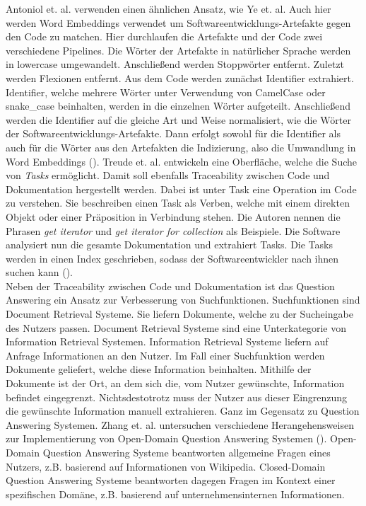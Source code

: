 Antoniol et. al. verwenden einen ähnlichen Ansatz, wie Ye et. al.
Auch hier werden Word Embeddings verwendet um Softwareentwicklungs-Artefakte gegen den Code zu matchen.
Hier durchlaufen die Artefakte und der Code zwei verschiedene Pipelines.
Die Wörter der Artefakte in natürlicher Sprache werden in lowercase umgewandelt.
Anschließend werden Stoppwörter entfernt.
Zuletzt werden Flexionen entfernt.
Aus dem Code werden zunächst Identifier extrahiert.
Identifier, welche mehrere Wörter unter Verwendung von CamelCase oder snake\_case beinhalten, werden in die einzelnen Wörter aufgeteilt.
Anschließend werden die Identifier auf die gleiche Art und Weise normalisiert, wie die Wörter der Softwareentwicklungs-Artefakte.
Dann erfolgt sowohl für die Identifier als auch für die Wörter aus den Artefakten die Indizierung, also die Umwandlung in Word Embeddings (\cite{Antoniol_Canfora_Casazza_DeLucia_2000}).
Treude et. al. entwickeln eine Oberfläche, welche die Suche von \textit{Tasks} ermöglicht.
Damit soll ebenfalls Traceability zwischen Code und Dokumentation hergestellt werden.
Dabei ist unter Task eine Operation im Code zu verstehen.
Sie beschreiben einen Task als Verben, welche mit einem direkten Objekt oder einer Präposition in Verbindung stehen.
Die Autoren nennen die Phrasen \textit{get iterator} und \textit{get iterator for collection} als Beispiele.
Die Software analysiert nun die gesamte Dokumentation und extrahiert Tasks.
Die Tasks werden in einen Index geschrieben, sodass der Softwareentwickler nach ihnen suchen kann (\cite{Treude_Sicard_Klocke_Robillard_2015}).\\

Neben der Traceability zwischen Code und Dokumentation ist das Question Answering ein Ansatz zur Verbesserung von Suchfunktionen.
Suchfunktionen sind Document Retrieval Systeme.
Sie liefern Dokumente, welche zu der Sucheingabe des Nutzers passen.
Document Retrieval Systeme sind eine Unterkategorie von Information Retrieval Systemen.
Information Retrieval Systeme liefern auf Anfrage Informationen an den Nutzer.
Im Fall einer Suchfunktion werden Dokumente geliefert, welche diese Information beinhalten.
Mithilfe der Dokumente ist der Ort, an dem sich die, vom Nutzer gewünschte, Information befindet eingegrenzt.
Nichtsdestotrotz muss der Nutzer aus dieser Eingrenzung die gewünschte Information manuell extrahieren.
Ganz im Gegensatz zu Question Answering Systemen.
Zhang et. al. untersuchen verschiedene Herangehensweisen zur Implementierung von Open-Domain Question Answering Systemen (\cite{Zhang_Chen_Xu_Cao_Chen_Cohn_Fang_2023}).
Open-Domain Question Answering Systeme beantworten allgemeine Fragen eines Nutzers, z.B. basierend auf Informationen von Wikipedia.
Closed-Domain Question Answering Systeme beantworten dagegen Fragen im Kontext einer spezifischen Domäne, z.B. basierend auf unternehmensinternen Informationen.\\

